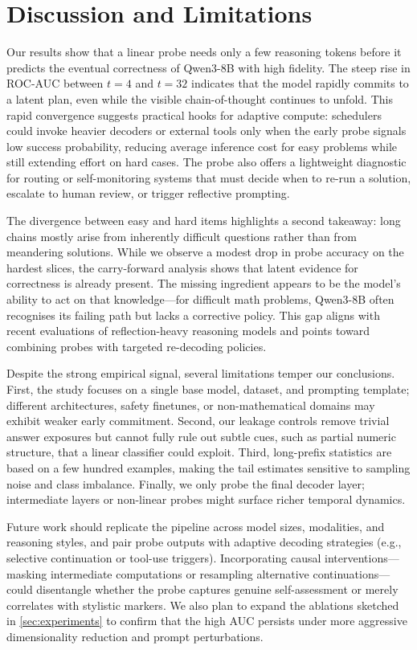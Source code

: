 \documentclass[10pt,a4paper,twocolumn]{article}
\begin{document}
\section{Discussion and Limitations}
\label{sec:discussion}
Our results show that a linear probe needs only a few reasoning tokens before it predicts the eventual correctness of Qwen3-8B with high fidelity.  The steep rise in ROC-AUC between $t{=}4$ and $t{=}32$ indicates that the model rapidly commits to a latent plan, even while the visible chain-of-thought continues to unfold.  This rapid convergence suggests practical hooks for adaptive compute: schedulers could invoke heavier decoders or external tools only when the early probe signals low success probability, reducing average inference cost for easy problems while still extending effort on hard cases.  The probe also offers a lightweight diagnostic for routing or self-monitoring systems that must decide when to re-run a solution, escalate to human review, or trigger reflective prompting.

The divergence between easy and hard items highlights a second takeaway: long chains mostly arise from inherently difficult questions rather than from meandering solutions.  While we observe a modest drop in probe accuracy on the hardest slices, the carry-forward analysis shows that latent evidence for correctness is already present.  The missing ingredient appears to be the model's ability to act on that knowledge—for difficult math problems, Qwen3-8B often recognises its failing path but lacks a corrective policy.  This gap aligns with recent evaluations of reflection-heavy reasoning models and points toward combining probes with targeted re-decoding policies.

Despite the strong empirical signal, several limitations temper our conclusions.  First, the study focuses on a single base model, dataset, and prompting template; different architectures, safety finetunes, or non-mathematical domains may exhibit weaker early commitment.  Second, our leakage controls remove trivial answer exposures but cannot fully rule out subtle cues, such as partial numeric structure, that a linear classifier could exploit.  Third, long-prefix statistics are based on a few hundred examples, making the tail estimates sensitive to sampling noise and class imbalance.  Finally, we only probe the final decoder layer; intermediate layers or non-linear probes might surface richer temporal dynamics.

Future work should replicate the pipeline across model sizes, modalities, and reasoning styles, and pair probe outputs with adaptive decoding strategies (e.g., selective continuation or tool-use triggers).  Incorporating causal interventions—masking intermediate computations or resampling alternative continuations—could disentangle whether the probe captures genuine self-assessment or merely correlates with stylistic markers.  We also plan to expand the ablations sketched in \cref{sec:experiments} to confirm that the high AUC persists under more aggressive dimensionality reduction and prompt perturbations.
\end{document}
